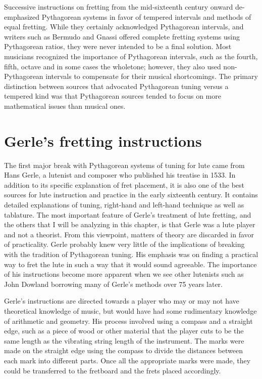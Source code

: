Successive instructions on fretting from the mid-sixteenth century onward de-emphasized
Pythagorean systems in favor of tempered intervals and methods of equal fretting.  While
they certainly acknowledged Pythagorean intervals, and writers such as Bermudo and Gnassi
offered complete fretting systems using Pythagorean ratios, they were never intended to be
a final solution. Most musicians recognized the importance of Pythagorean intervals, such
as the fourth, fifth, octave and in some cases the wholetone; however, they also used
non-Pythagorean intervals to compensate for their musical shortcomings.  The primary
distinction between sources that advocated Pythagorean tuning versus a tempered kind was
that Pythagorean sources tended to focus on more mathematical issues than musical ones.


%
%
\section{Gerle's fretting instructions}

The first major break with Pythagorean systems of tuning for lute came from Hans Gerle, a
lutenist and composer who published his treatise in 1533.  In addition to its specific
explanation of fret placement, it is also one of the best sources for lute instruction and
practice in the early sixteenth century.  It contains detailed explanations of tuning,
right-hand and left-hand technique as well as tablature.  The most important feature of
Gerle's treatment of lute fretting, and the others that I will be analyzing in this
chapter, is that Gerle was a lute player and not a theorist. From this viewpoint, matters
of theory are discarded in favor of practicality.  Gerle probably knew very little of the
implications of breaking with the tradition of Pythagorean tuning.  His emphasis was on
finding a practical way to fret the lute in such a way that it would sound agreeable.  The
importance of his instructions become more apparent when we see other lutenists such as
John Dowland borrowing many of Gerle's methods over 75 years later.

Gerle's instructions are directed towards a player who may or may not have theoretical
knowledge of music, but would have had some rudimentary knowledge of arithmetic and
geometry.  His process involved using a compass and a straight edge, such as a piece of
wood or other material that the player cuts to be the same length as the vibrating string
length of the instrument.  The marks were made on the straight edge using the compass to
divide the distances between each mark into different parts.  Once all the appropriate
marks were made, they could be transferred to the fretboard and the frets placed
accordingly.

